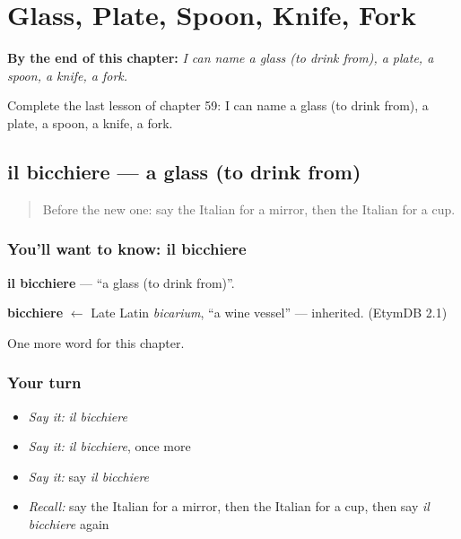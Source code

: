 
\chapter{Glass, Plate, Spoon, Knife, Fork}
\label{ch:it-glass-plate-spoon-knife-fork}

\begin{chapteropening}
\textbf{By the end of this chapter:} \emph{I can name a glass (to drink from), a plate, a spoon, a knife, a fork.}

Complete the last lesson of chapter 59: I can name a glass (to drink from), a plate, a spoon, a knife, a fork.
\end{chapteropening}

\section[il bicchiere]{il bicchiere — a glass (to drink from)}

\label{lesson:IT-C59-bicchiere}



\begin{quote}
Before the new one: say the Italian for a mirror, then the Italian for a cup.
\end{quote}

\subsection*{You'll want to know: il bicchiere}
\textbf{il bicchiere} — \textquotedblleft{}a glass (to drink from)\textquotedblright{}.

\begin{cousinweb}
\textbf{bicchiere} $\leftarrow$ Late Latin \emph{bicarium}, \textquotedblleft{}a wine vessel\textquotedblright{} — inherited. (EtymDB 2.1)
\end{cousinweb}

\begin{grammarlens}[title={What you've built}]
One more word for this chapter.
\end{grammarlens}

\subsection*{Your turn}
\begin{itemize}
\raggedright
  \item \emph{Say it:} \emph{il bicchiere}
  \item \emph{Say it:} \emph{il bicchiere}, once more
  \item \emph{Say it:} say \emph{il bicchiere}
  \item \emph{Recall:} say the Italian for a mirror, then the Italian for a cup, then say \emph{il bicchiere} again
\end{itemize}

